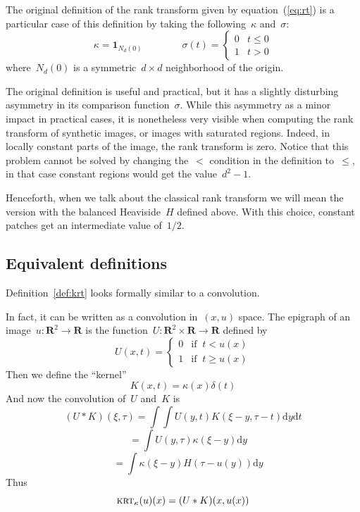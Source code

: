 \documentclass[12pt]{article}                  %
\begin{document}
The original definition of the rank transform given by
equation~(\ref{eq:rt}) is a particular case of this definition by taking
the following~$\kappa$ and~$\sigma$:
\[
	\kappa=\mathbf{1}_{N_d(0)}
	\qquad
	\qquad
	\sigma(t)=\begin{cases}0&t\le0\\1&t>0\end{cases}
\]
where~$N_d(0)$ is a symmetric~$d\times d$ neighborhood of the origin.

The original definition is useful and practical, but it has a slightly
disturbing asymmetry in its comparison function~$\sigma$.  While this
asymmetry as a minor impact in practical cases, it is nonetheless very
visible when computing the rank transform of synthetic images, or images
with saturated regions.  Indeed, in locally constant parts of the image, the
rank transform is zero.  Notice that this problem cannot be solved by
changing the~$<$ condition in the definition to~$\le$, in that case constant
regions would get the value~$d^2-1$.

Henceforth, when we talk about the classical rank transform we will mean the
version with the balanced Heaviside~$H$ defined above.  With this choice,
constant patches get an intermediate value of~$1/2$.



\subsection{Equivalent definitions}


Definition~\ref{def:krt} looks formally similar to a convolution.

In fact, it can be written as a convolution in~$(x,u)$ space.
The epigraph of an image~$u:\mathbf{R}^2\to\mathbf{R}$ is the
function~$U:\mathbf{R}^2\times\mathbf{R}\to\mathbf{R}$ defined by
\[
	U(x,t) = \begin{cases}
		0 & \textrm{if $\ t< u(x)$} \\
		1 & \textrm{if $\ t\ge u(x)$}
	\end{cases}
\]
Then we define the ``kernel''
\[
	K(x,t) = \kappa(x)\delta(t)
\]
And now the convolution of~$U$ and~$K$ is
\[
	(U*K)(\xi,\tau)
	=
	\int
	\int U\left(y,t\right)K\left(\xi-y,\tau-t\right)
		\mathrm{d} y
		\mathrm{d} t
\]
\[
	\quad
	=\int
	U(y,\tau)
	\kappa(\xi - y)
		\mathrm{d} y
\]
\[
	\quad
	=\int\kappa(\xi-y)H(\tau - u(y))
		\mathrm{d} y
\]
Thus
\begin{equation}\label{eq:convolution1}
	\textsc{krt}_\kappa(u)(x)=(U*K)(x,u(x))
\end{equation}
\end{document}
